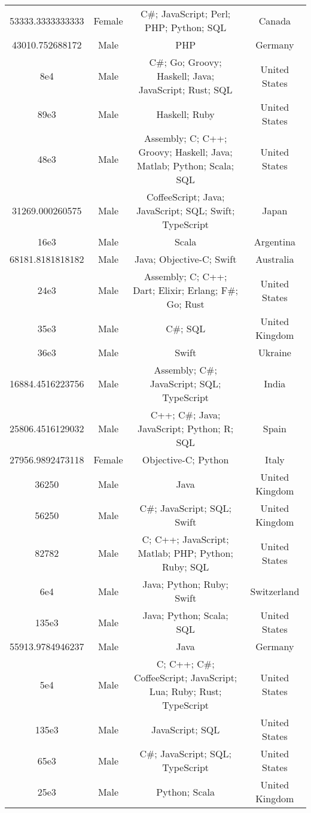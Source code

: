 \begin{center}
\begin{tabular}{ |c|c|c|c| }
53333.3333333333  &  Female  &  C\#; JavaScript; Perl; PHP; Python; SQL  &  Canada  \\ 
43010.752688172  &  Male  &  PHP  &  Germany  \\ 
8e4  &  Male  &  C\#; Go; Groovy; Haskell; Java; JavaScript; Rust; SQL  &  United States  \\ 
89e3  &  Male  &  Haskell; Ruby  &  United States  \\ 
48e3  &  Male  &  Assembly; C; C++; Groovy; Haskell; Java; Matlab; Python; Scala; SQL  &  United States  \\ 
31269.000260575  &  Male  &  CoffeeScript; Java; JavaScript; SQL; Swift; TypeScript  &  Japan  \\ 
16e3  &  Male  &  Scala  &  Argentina  \\ 
68181.8181818182  &  Male  &  Java; Objective-C; Swift  &  Australia  \\ 
24e3  &  Male  &  Assembly; C; C++; Dart; Elixir; Erlang; F\#; Go; Rust  &  United States  \\ 
35e3  &  Male  &  C\#; SQL  &  United Kingdom  \\ 
36e3  &  Male  &  Swift  &  Ukraine  \\ 
16884.4516223756  &  Male  &  Assembly; C\#; JavaScript; SQL; TypeScript  &  India  \\ 
25806.4516129032  &  Male  &  C++; C\#; Java; JavaScript; Python; R; SQL  &  Spain  \\ 
27956.9892473118  &  Female  &  Objective-C; Python  &  Italy  \\ 
36250  &  Male  &  Java  &  United Kingdom  \\ 
56250  &  Male  &  C\#; JavaScript; SQL; Swift  &  United Kingdom  \\ 
82782  &  Male  &  C; C++; JavaScript; Matlab; PHP; Python; Ruby; SQL  &  United States  \\ 
6e4  &  Male  &  Java; Python; Ruby; Swift  &  Switzerland  \\ 
135e3  &  Male  &  Java; Python; Scala; SQL  &  United States  \\ 
55913.9784946237  &  Male  &  Java  &  Germany  \\ 
5e4  &  Male  &  C; C++; C\#; CoffeeScript; JavaScript; Lua; Ruby; Rust; TypeScript  &  United States  \\ 
135e3  &  Male  &  JavaScript; SQL  &  United States  \\ 
65e3  &  Male  &  C\#; JavaScript; SQL; TypeScript  &  United States  \\ 
25e3  &  Male  &  Python; Scala  &  United Kingdom  \\ 

\end{tabular}
\end{center}
